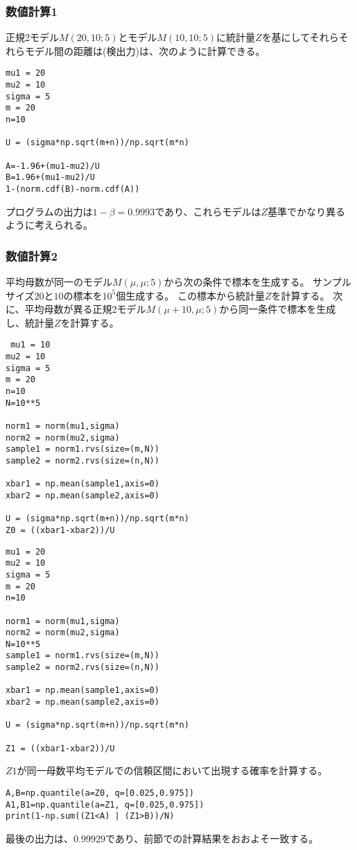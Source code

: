 \subsubsection{数値計算1}
正規2モデル$M(20,10;5)$とモデル$M(10,10;5)$に統計量$Z$を基にしてそれらそれらモデル間の距離は(検出力)は、次のように計算できる。
\begin{lstlisting}
mu1 = 20
mu2 = 10
sigma = 5
m = 20
n=10

U = (sigma*np.sqrt(m+n))/np.sqrt(m*n)

A=-1.96+(mu1-mu2)/U
B=1.96+(mu1-mu2)/U
1-(norm.cdf(B)-norm.cdf(A))
\end{lstlisting}
プログラムの出力は$1-\beta = 0.9993$であり、これらモデルは$Z$基準でかなり異るように考えられる。

\subsubsection{数値計算2}
平均母数が同一のモデル$M(\mu,\mu;5)$から次の条件で標本を生成する。
サンプルサイズ$20$と$10$の標本を$10^5$個生成する。
この標本から統計量$Z$を計算する。
次に、平均母数が異る正規2モデル$M(\mu+10,\mu;5)$から同一条件で標本を生成し、統計量$Z$を計算する。

\begin{lstlisting}
 mu1 = 10
mu2 = 10
sigma = 5
m = 20
n=10
N=10**5

norm1 = norm(mu1,sigma)
norm2 = norm(mu2,sigma)
sample1 = norm1.rvs(size=(m,N))
sample2 = norm2.rvs(size=(n,N))

xbar1 = np.mean(sample1,axis=0)
xbar2 = np.mean(sample2,axis=0)

U = (sigma*np.sqrt(m+n))/np.sqrt(m*n)
Z0 = ((xbar1-xbar2))/U

\end{lstlisting}

\begin{lstlisting}
mu1 = 20
mu2 = 10
sigma = 5
m = 20
n=10

norm1 = norm(mu1,sigma)
norm2 = norm(mu2,sigma)
N=10**5
sample1 = norm1.rvs(size=(m,N))
sample2 = norm2.rvs(size=(n,N))

xbar1 = np.mean(sample1,axis=0)
xbar2 = np.mean(sample2,axis=0)

U = (sigma*np.sqrt(m+n))/np.sqrt(m*n)

Z1 = ((xbar1-xbar2))/U
\end{lstlisting}

$Z1$が同一母数平均モデルでの信頼区間において出現する確率を計算する。
\begin{lstlisting}
A,B=np.quantile(a=Z0, q=[0.025,0.975])
A1,B1=np.quantile(a=Z1, q=[0.025,0.975])
print(1-np.sum((Z1<A) | (Z1>B))/N)
\end{lstlisting}
最後の出力は、$0.99929$であり、前節での計算結果をおおよそ一致する。


